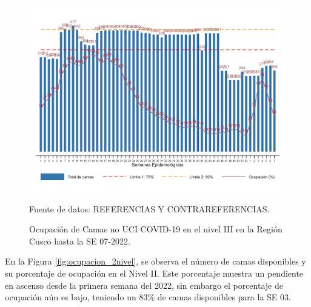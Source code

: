 \documentclass[12pt,a4paper,openany]{book}
\begin{document}
\begin{figure}[htpb]
	\caption{Ocupación de Camas no UCI COVID-19 en el nivel III en la Región Cusco hasta la SE 07-2022.}\label{fig:ocupacion_3_nivel}
	\begin{center}
		\includegraphics[width=0.95\linewidth]{../figuras/nivel_3.png}
	\end{center}
	{\footnotesize {Fuente de datos: REFERENCIAS Y CONTRAREFERENCIAS.}}
\end{figure}

\clearpage

En la Figura \ref{fig:ocupacion_2nivel}, se observa el número de camas disponibles y su porcentaje de ocupación en el Nivel II. Este porcentaje muestra un pendiente en ascenso desde la primera semana del 2022, sin embargo el porcentaje de ocupación aún es bajo, teniendo un 83$\%$ de camas disponibles para la SE 03.   
\end{document}
